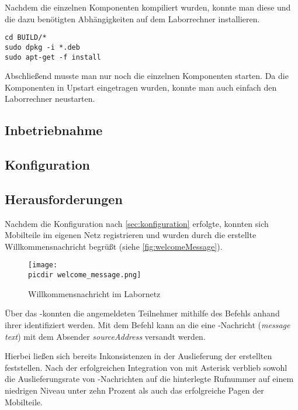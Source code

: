 Nachdem die einzelnen Komponenten kompiliert wurden, konnte man diese und die dazu benötigten Abhängigkeiten auf dem Laborrechner installieren.

\begin{lstlisting}
cd BUILD/*
sudo dpkg -i *.deb
sudo apt-get -f install
\end{lstlisting}

Abschließend musste man nur noch die einzelnen Komponenten starten. Da die Komponenten in Upstart eingetragen wurden, konnte man auch einfach den Laborrechner neustarten.

\subsection{Inbetriebnahme}
\label{sec:inbetriebnahme}

\subsection{Konfiguration}
\label{sec:konfiguration}

\subsection{Herausforderungen}
Nachdem die Konfiguration nach \autoref{sec:konfiguration} erfolgte, konnten sich Mobilteile im eigenen Netz registrieren und wurden durch die erstellte Willkommensnachricht begrüßt (siehe \autoref{fig:welcomeMessage}).

\begin{figure}[h!]
	\centering
	\texttt{[image: \\picdir welcome\_message.png]}
	\caption{Willkommensnachricht im Labornetz}
	\label{fig:welcomeMessage}
	
\end{figure}
Über das \OpenBTS-\CLI konnten die angemeldeten Teilnehmer mithilfe des Befehls  anhand ihrer \IMSI identifiziert werden. Mit dem Befehl  kann an die \emph{\IMSI} eine \SMS-Nachricht (\emph{message text}) mit dem Absender \emph{sourceAddress} versandt werden.

Hierbei ließen sich bereits Inkonsistenzen in der Auslieferung der erstellten \SMS feststellen. Nach der erfolgreichen Integration von \OpenBTS mit Asterisk verblieb sowohl die Auslieferungsrate von \SMS-Nachrichten auf die hinterlegte Rufnummer auf einem niedrigen Niveau unter zehn Prozent als auch das erfolgreiche Pagen der Mobilteile.
